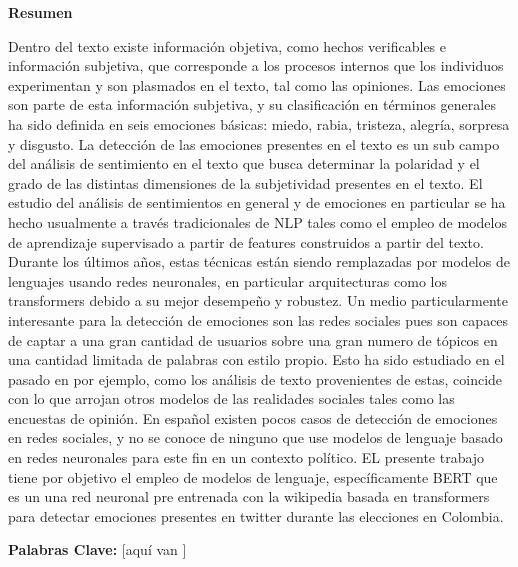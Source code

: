 \begin{center}
{\Large{\bf{Resumen}}}
\end{center}


Dentro del texto existe información objetiva, como hechos verificables e información subjetiva, que corresponde a los procesos internos que los individuos experimentan y son plasmados en el texto, tal como las opiniones.
Las emociones son parte de esta información subjetiva, y su clasificación en términos generales ha sido definida en seis emociones básicas: miedo, rabia, tristeza, alegría, sorpresa y disgusto.
La detección de las emociones presentes en el texto es un sub campo del análisis de sentimiento en el texto que busca determinar la polaridad y el grado de las distintas dimensiones de la subjetividad presentes en el texto.
El estudio del análisis de sentimientos en general y de emociones en particular se ha hecho usualmente a través tradicionales de NLP tales como el empleo de modelos de aprendizaje supervisado a partir de features construidos a partir del texto.
Durante los últimos años, estas técnicas están siendo remplazadas por modelos de lenguajes usando redes neuronales, en particular arquitecturas como los transformers debido a su mejor desempeño y robustez.
Un medio particularmente interesante para la detección de emociones son las redes sociales pues son capaces de captar a una gran cantidad de usuarios sobre una gran numero de tópicos en una cantidad limitada de palabras con estilo propio. Esto ha sido estudiado en el pasado en por ejemplo, como los análisis de texto provenientes de estas, coincide con lo que arrojan otros modelos de las realidades sociales tales como las encuestas de opinión.
En español existen pocos casos de detección de emociones en redes sociales, y no se conoce de ninguno que use modelos de lenguaje basado en redes neuronales para este fin en un contexto político.
EL presente  trabajo tiene por objetivo el empleo de modelos de lenguaje, específicamente  BERT que es un una red neuronal pre entrenada con la wikipedia basada en transformers para detectar emociones presentes en twitter durante las elecciones en Colombia.

\vspace{4cm} %
\textbf{Palabras Clave:} [aquí van ]

\clearpage